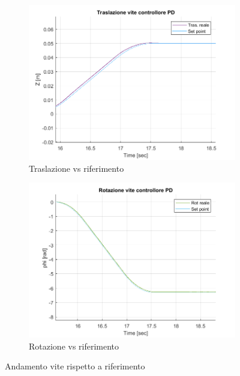\begin{figure}
	\centering
	\begin{subfigure}{.45\textwidth}
		\centering
		\includegraphics[width=.8\linewidth]{Immagini/Traiettorie/TrasVitePD}  
		\caption{Traslazione vs riferimento}
		\label{fig:sub-v1}
	\end{subfigure}
	\begin{subfigure}{.45\textwidth}
		\centering
		\includegraphics[width=.8\linewidth]{Immagini/Traiettorie/RotVitePD}  
		\caption{Rotazione vs riferimento}
		\label{fig:sub-v2}
	\end{subfigure}
	\caption{Andamento vite rispetto a riferimento}
	\label{fig:ViteMovimenti}
\end{figure}
